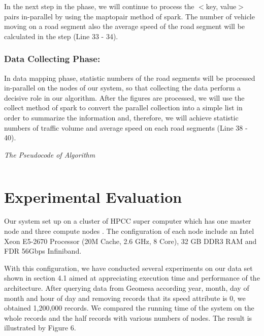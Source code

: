\documentclass{acm_proc_article-sp}
\begin{document}
\setlength{\parindent}{0.7cm} In the next step in the phase, we will continue to process the $<$key, value$>$ pairs in-parallel by using the maptopair method of spark. The number of vehicle moving on a road segment also the average speed of the road segment will be calculated in the step (Line 33 - 34).

\subsubsection{Data Collecting Phase:} In data mapping phase, statistic numbers of the road segments will be processed in-parallel on the nodes of our system, so that collecting the data perform a decisive role in our algorithm. After the figures are processed, we will use the collect method of spark to convert the parallel collection into a simple list in order to summarize the information and, therefore, we will achieve statistic numbers of traffic volume and average speed on each road segments (Line 38 - 40).


{\it The Pseudocode of Algorithm}	
\begin{verbatim}

\end{verbatim}
%
\noindent

\section{Experimental Evaluation}
	Our system set up on a cluster of HPCC super computer which has one master node and three compute nodes . The configuration of each node include an Intel Xeon E5-2670 Processor (20M Cache, 2.6 GHz, 8 Core), 32 GB DDR3 RAM and FDR 56Gbps Infiniband.
	
	With this configuration, we have conducted several experiments on our data set shown in section 4.1 aimed at appreciating execution time and performance of the architecture. After querying data from Geomesa according year, month, day of month and hour of day and removing records that its speed attribute is 0, we obtained 1,200,000 records. We compared the running time of the system on the whole records and the half records with various numbers of nodes. The result is illustrated by Figure 6.
	
	
\end{document}
